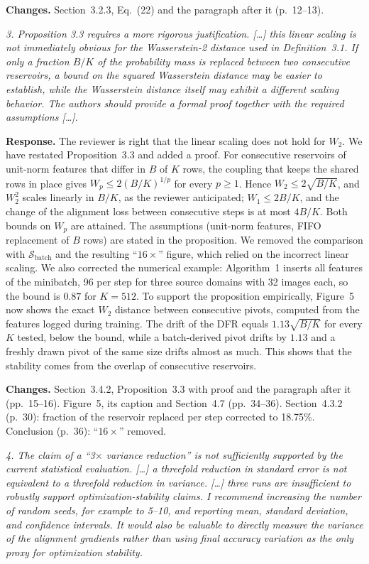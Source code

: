 \documentclass[11pt]{article}
\newenvironment{comment}{\par\medskip\noindent\begin{minipage}{\linewidth}\color{revcol}\itshape}{\end{minipage}\par\smallskip}
\newcommand{\resp}{\noindent\textbf{Response.} }
\newcommand{\chg}{\noindent\textbf{Changes.} }
\begin{document}
\chg Section~3.2.3, Eq.~(22) and the paragraph after it (p.~12--13).

\begin{comment}
3. Proposition 3.3 requires a more rigorous justification. [\dots] this linear scaling is not immediately obvious for the Wasserstein-2 distance used in Definition~3.1. If only a fraction $B/K$ of the probability mass is replaced between two consecutive reservoirs, a bound on the squared Wasserstein distance may be easier to establish, while the Wasserstein distance itself may exhibit a different scaling behavior. The authors should provide a formal proof together with the required assumptions [\dots].
\end{comment}

\resp The reviewer is right that the linear scaling does not hold for $W_2$. We have restated Proposition~3.3 and added a proof. For consecutive reservoirs of unit-norm features that differ in $B$ of $K$ rows, the coupling that keeps the shared rows in place gives $W_p\le2(B/K)^{1/p}$ for every $p\ge1$. Hence $W_2\le2\sqrt{B/K}$, and $W_2^2$ scales linearly in $B/K$, as the reviewer anticipated; $W_1\le2B/K$, and the change of the alignment loss between consecutive steps is at most $4B/K$. Both bounds on $W_p$ are attained. The assumptions (unit-norm features, FIFO replacement of $B$ rows) are stated in the proposition. We removed the comparison with $\mathcal S_{\text{batch}}$ and the resulting ``$16\times$'' figure, which relied on the incorrect linear scaling. We also corrected the numerical example: Algorithm~1 inserts all features of the minibatch, 96 per step for three source domains with 32 images each, so the bound is $0.87$ for $K=512$. To support the proposition empirically, Figure~5 now shows the exact $W_2$ distance between consecutive pivots, computed from the features logged during training. The drift of the DFR equals $1.13\sqrt{B/K}$ for every $K$ tested, below the bound, while a batch-derived pivot drifts by $1.13$ and a freshly drawn pivot of the same size drifts almost as much. This shows that the stability comes from the overlap of consecutive reservoirs.

\chg Section~3.4.2, Proposition~3.3 with proof and the paragraph after it (pp.~15--16). Figure~5, its caption and Section~4.7 (pp.~34--36). Section~4.3.2 (p.~30): fraction of the reservoir replaced per step corrected to 18.75\%. Conclusion (p.~36): ``$16\times$'' removed.

\begin{comment}
4. The claim of a ``3$\times$ variance reduction'' is not sufficiently supported by the current statistical evaluation. [\dots] a threefold reduction in standard error is not equivalent to a threefold reduction in variance. [\dots] three runs are insufficient to robustly support optimization-stability claims. I recommend increasing the number of random seeds, for example to 5--10, and reporting mean, standard deviation, and confidence intervals. It would also be valuable to directly measure the variance of the alignment gradients rather than using final accuracy variation as the only proxy for optimization stability.
\end{comment}
\end{document}
